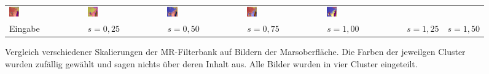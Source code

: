 \begin{figure}[h!]
\begin{tabular}{p{}p{}p{}p{}p{}p{}p{}}
		\includegraphics[width=0.14\textwidth]{images/gen/GEN_filterbanks_p03_04_MR_0.5.png} &
		\includegraphics[width=0.14\textwidth]{images/gen/GEN_filterbanks_p03_04_MR_0.75.png} &
		\includegraphics[width=0.14\textwidth]{images/gen/GEN_filterbanks_p03_04_MR_1.0.png} &
		\includegraphics[width=0.14\textwidth]{images/gen/GEN_filterbanks_p03_04_MR_1.25.png} &
		\includegraphics[width=0.14\textwidth]{images/gen/GEN_filterbanks_p03_04_MR_1.5.png} \\
		
		\hspace{2pt}\newline\centering Eingabe & 
		\hspace{2pt}\newline\centering $s=0,25$ &
		\hspace{2pt}\newline\centering $s=0,50$ &
		\hspace{2pt}\newline\centering $s=0,75$ &
		\hspace{2pt}\newline\centering $s=1,00$ &
		\hspace{2pt}\newline\centering $s=1,25$ &
		\hspace{2pt}\newline\centering $s=1,50$
	\end{tabular}
	\caption{Vergleich verschiedener Skalierungen der MR-Filterbank auf Bildern der Marsoberfläche. Die Farben der jeweilgen Cluster wurden zufällig gewählt und sagen nichts über deren Inhalt aus. Alle Bilder wurden in vier Cluster eingeteilt.}
	\label{fig:filterbank_sizes}
\end{figure}

